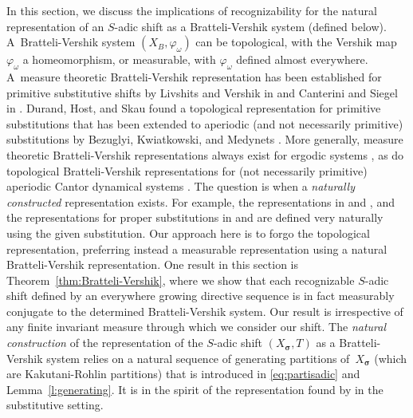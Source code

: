 \documentclass{amsart}
\theoremstyle{definition}
\theoremstyle{remark}
\numberwithin{equation}{section}
\begin{document}
In this section, we discuss the implications of recognizability for the natural representation of an $S$-adic shift as a Bratteli-Vershik system (defined below).  
A~Bratteli-Vershik system $(X_B,\varphi_\omega)$ can be topological, with the Vershik map~$\varphi_\omega$ a homeomorphism, or measurable, with $\varphi_\omega$ defined almost everywhere.  
A~measure theoretic Bratteli-Vershik representation has been established for primitive substitutive shifts by Livshits and Vershik in \cite{Livshits-Vershik} and Canterini and Siegel in \cite{CS01b, CanSie:2001}.
Durand, Host, and Skau \cite{Durand-Host-Skau}  found a topological representation for primitive substitutions that has been extended to aperiodic  (and not necessarily primitive) substitutions by Bezuglyi, Kwiatkowski, and Medynets \cite{Bezugly:2009}. 
More generally, measure theoretic Bratteli-Vershik representations always exist for ergodic systems \cite{Vershik:1985}, as do topological  Bratteli-Vershik representations for (not necessarily primitive) aperiodic Cantor  dynamical systems \cite{medynets:06}. 
The question is when a \emph{naturally constructed} representation exists. 
For example, the representations in \cite{Livshits-Vershik} and \cite{CS01b, CanSie:2001}, and the representations for proper substitutions in  \cite{Durand-Host-Skau} and \cite{Bezugly:2009} are defined very naturally using the given substitution. 
Our approach here is to forgo the topological representation, preferring instead a measurable representation using a natural Bratteli-Vershik representation. 
One result in this section is Theorem~\ref{thm:Bratteli-Vershik}, where we show that each recognizable $S$-adic shift defined by an everywhere growing directive sequence is in fact measurably conjugate to the determined Bratteli-Vershik system. 
Our result is irrespective of any finite invariant measure through which we consider our shift. 
The \emph{natural construction} of the representation of the $S$-adic shift $(X_{\boldsymbol{\sigma}},T)$ as a Bratteli-Vershik system relies on a  natural sequence of  generating partitions of~$X_{\boldsymbol{\sigma}}$  (which are Kakutani-Rohlin partitions) that is introduced in \eqref{eq:partisadic} and Lemma~\ref{l:generating}. 
It is in the spirit of the representation found by \cite{CS01b, CanSie:2001} in the substitutive setting.
\end{document}
